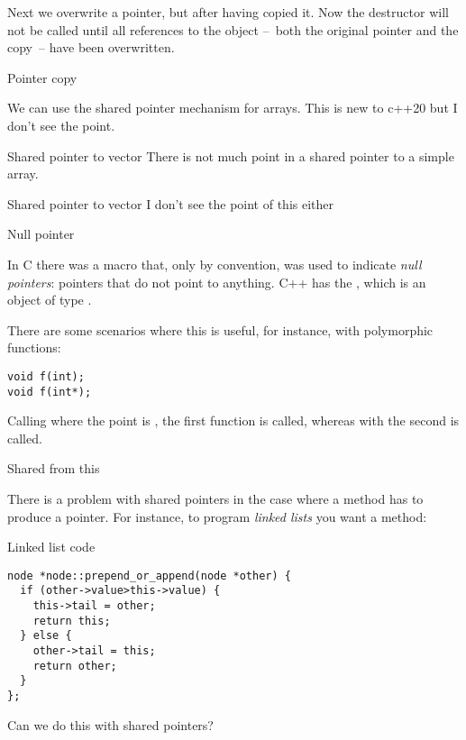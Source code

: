 Next we overwrite a pointer, but after having copied it. Now the
destructor will not be called until all references to the object
--~both the original pointer and the copy~-- have been overwritten.
%
\begin{block}{Pointer copy}
  \label{sl:shared-ptr-copy}
\end{block}

\begin{remark}
  We can use the shared pointer mechanism for arrays. This is new to
  c++20 but I don't see the point.
\begin{block}{Shared pointer to vector}
    \label{sl:shared-ptr-doubles}
    There is not much point in a shared pointer to a simple array.
\end{block}
\begin{block}{Shared pointer to vector}
    \label{sl:shared-ptr-things}
    I don't see the point of this either
\end{block}
\end{remark}

 {Null pointer}

In C there was a macro  that, only by convention, was
used to indicate
\emph{null pointers}:
pointers that do not point to anything.
C++ has the , which is an object of type
.

There are some scenarios where this is useful, for instance, with
polymorphic functions:
\begin{verbatim}
void f(int);
void f(int*);
\end{verbatim}
Calling  where the point is , the first function is
called, whereas with  the second is called.

 {Shared from this}

There is a problem with shared pointers in the case where a method has
to produce a pointer. For instance, to program
\emph{linked lists} you want a
method:
\begin{slide}{Linked list code}
  \label{sl:share-ptr-node}  
\begin{verbatim}
node *node::prepend_or_append(node *other) {
  if (other->value>this->value) {
    this->tail = other;
    return this;
  } else {
    other->tail = this;
    return other;
  }
};
\end{verbatim}
Can we do this with shared pointers?
\end{slide}

